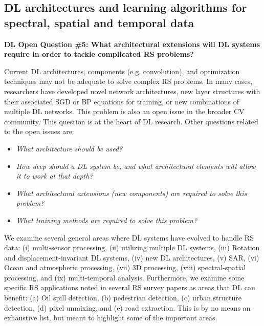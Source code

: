 \documentclass[12pt]{spieman}
\newcommand{\ParSection}[1]{}
\begin{document}
\begin{spacing}{1}
\subsection{DL architectures and learning algorithms for spectral, spatial and temporal data} \label{subsec:ChallengesOpportunities_v}
\ParSection{Optimal architectures and architectural extensions}
\textbf{DL Open Question \#5: What architectural extensions will DL systems require in order to tackle complicated RS problems?}

Current DL architectures, components (e.g. convolution), and optimization techniques may not be adequate to solve complex RS problems. In many cases, researchers have developed novel network architectures, new layer structures with their associated SGD or BP equations for training, or new combinations of multiple DL networks. This problem is also an open issue in the broader CV community. This question is at the heart of DL research. Other questions related to the open issues are:

\begin{itemize}
    \setlength{\parskip}{0pt}
    \setlength{\itemsep}{0pt plus 1pt}
    \item \textit{What architecture should be used?}
    \item \textit{How deep should a DL system be, and what architectural elements will allow it to work at that depth?}
    \item \textit{What architectural extensions (new components) are required to solve this problem?}
    \item \textit{What training methods are required to solve this problem?}
\end{itemize}

We examine several general areas where DL systems have evolved to handle RS data: (i) multi-sensor processing, (ii) utilizing multiple DL systems, (iii) Rotation and displacement-invariant DL systems, (iv) new DL architectures, (v) SAR, (vi) Ocean and atmospheric processing, (vii) 3D processing,  (viii) spectral-spatial processing, and (ix) multi-temporal analysis. Furthermore, we examine some specific RS applications noted in several RS survey papers as areas that DL can benefit: (a) Oil spill detection, (b) pedestrian detection, (c) urban structure detection, (d) pixel unmixing, and (e) road extraction. This is by no means an exhaustive list, but meant to highlight some of the important areas.


\end{spacing}
\end{document}
